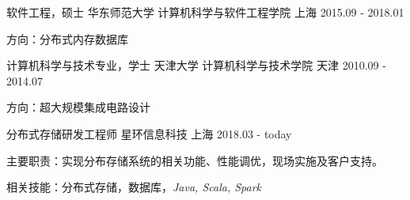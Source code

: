 \begin{cventries}
  \cventry
    {软件工程，硕士}
    {华东师范大学 \quad 计算机科学与软件工程学院}
    {上海}
    {2015.09 - 2018.01}
    {
      \begin{cvitems}
        \item {方向：分布式内存数据库}
      \end{cvitems}
    }
    \cventry
    {计算机科学与技术专业，学士}
    {天津大学 \quad 计算机科学与技术学院}
    {天津}
    {2010.09 - 2014.07}
    {
      \begin{cvitems}
        \item {方向：超大规模集成电路设计}
      \end{cvitems}
    }
\end{cventries}
\begin{cventries}
  \cventry
    {分布式存储研发工程师}
    {星环信息科技}
    {上海}
    {2018.03 - today}
    {
      \begin{cvitems}
        \item {主要职责：实现分布存储系统的相关功能、性能调优，现场实施及客户支持。}
        \item {相关技能：分布式存储，数据库，\it{Java, Scala, Spark}}
      \end{cvitems}
    }
\end{cventries}
